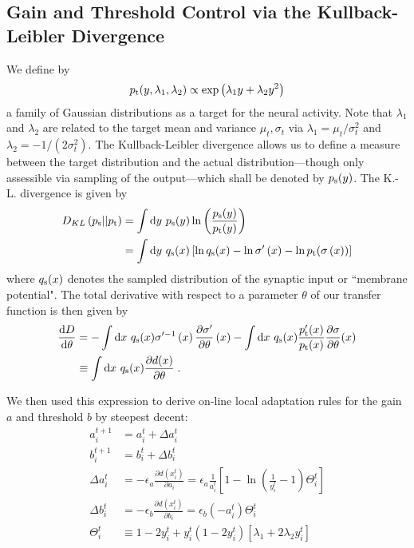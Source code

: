 \documentclass[10pt,a4paper]{article}
\newcommand{\diff}[1]{\mathrm{d}#1}
\newcommand{\psample}{p_{\rm s}}
\newcommand{\qsample}{q_{\rm s}}
\newcommand{\ptarget}{p_{\rm t}}
\begin{document}
\subsection{Gain and Threshold Control via the Kullback-Leibler Divergence}
We define by
\begin{equation}
\ptarget (y,\lambda_1,\lambda_2 ) \propto \exp\left(\lambda_1 y + \lambda_2 y^2\right)
\end{equation}
a family of Gaussian distributions as a target for the neural activity. Note that $\lambda_1$ and $\lambda_2$ are related to the target mean and variance $\mu_t,\sigma_t$ via $\lambda_1 = \mu_t/\sigma_t^2$ and $\lambda_2 = -1/\left(2 \sigma_t^2\right)$. The Kullback-Leibler divergence allows us to define a measure between the target distribution and the actual distribution---though only assessible via sampling of the output---which shall be denoted by $\psample (y)$. The K.-L. divergence is given by
\begin{align}
D_{KL}\left(p_{\rm s}||p_{\rm t}\right) &= \int \diff{y} \ \psample (y) \ln \left( \frac{\psample (y)}{\ptarget (y)} \right) \\
&= \int \diff{y} \ \qsample (x) \left[ \ln \qsample (x) - \ln\sigma '\left(x\right) - \ln \ptarget (\sigma\left(x\right)) \right]
\end{align}
where $\qsample (x)$ denotes the sampled distribution of the synaptic input or ``membrane potential". The total derivative with respect to a parameter $\theta$ of our transfer function is then given by
\begin{align}
\frac{\diff{D}}{\diff{\theta}} &= -\int \diff{x} \ \qsample (x) \sigma'^{-1} \left(x\right) \frac{\partial \sigma'}{\partial \theta} \left( x\right) - \int \diff{x} \ \qsample (x) \frac{\ptarget'(x)}{ \ptarget(x)} \frac{\partial \sigma}{\partial \theta} (x) \\
&\equiv \int \diff{x} \ \qsample (x) \frac{\partial d(x)}{\partial \theta} \; .
\end{align}

We then used this expression to derive on-line local adaptation rules for the gain $a$ and threshold $b$ by steepest decent:
\begin{align}
a^{t+1}_i &= a^t_i + \Delta a^t_i \\
b^{t+1}_i &= b^t_i + \Delta b^t_i \\
\Delta a^t_i &= - \epsilon_a \frac{\partial d(x^t_i)}{\partial a_i} = \epsilon_a \frac{1}{a^t_i}\left[ 1 - \ln \left( \frac{1}{y^t_i} - 1 \right) \Theta^t_i \right] \\
\Delta b^t_i &= - \epsilon_b \frac{\partial d(x^t_i)}{\partial b_i} = \epsilon_b \left(-a^t_i\right) \Theta^t_i \\
\Theta^t_i &\equiv 1-2y^t_i + y^t_i (1-2y^t_i)[\lambda_1 + 2\lambda_2 y^t_i]
\end{align}
\end{document}
